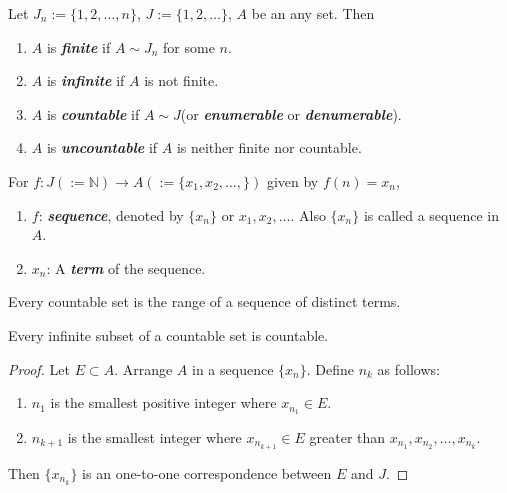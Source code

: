 \begin{definition}[pma 2.4]
Let $J_n:=\{1,2,\dots,n\}$, $J:=\{1,2,\dots\}$, $A$ be an any set. Then
\begin{enumerate}[label={(\arabic*)}]
\item $A$ is \textbf{\emph{finite}} if $A\sim J_n$ for some $n$.
\item $A$ is \textbf{\emph{infinite}} if $A$ is not finite.
\item $A$ is \textbf{\emph{countable}} if $A\sim J$(or \textbf{\emph{enumerable}} or \textbf{\emph{denumerable}}).
\item $A$ is \textbf{\emph{uncountable}} if $A$ is neither finite nor countable.
\end{enumerate}
\end{definition}

\begin{definition}[pma 2.7]
For $f:J(:=\mathbb{N})\to A(:=\{x_1,x_2,\dots,\})$ given by $f(n)=x_n$,
\begin{enumerate}[label={(\arabic*)}]
\item $f$: \textbf{\emph{sequence}}, denoted by $\{x_n\}$ or $x_1,x_2,\dots$. Also $\{x_n\}$ is called a sequence in $A$.
\item $x_n$: A \textbf{\emph{term}} of the sequence.
\end{enumerate}
\end{definition}

\begin{remark}[pma 2.7]
Every countable set is the range of a sequence of distinct terms.
\end{remark}


\begin{theorem}[pma 2.8]
Every infinite subset of a countable set is countable.
\end{theorem}
\begin{proof}
Let $E\subset A$. Arrange $A$ in a sequence $\{x_n\}$. Define $n_k$ as follows:
\begin{enumerate}[label={(\arabic*)}]
\item $n_1$ is the smallest positive integer where $x_{n_1}\in E$.
\item $n_{k+1}$ is the smallest integer where $x_{n_{k+1}}\in E$ greater than $x_{n_1}, x_{n_2}, \dots, x_{n_k}$.
\end{enumerate}
Then $\{x_{n_k}\}$ is an one-to-one correspondence between $E$ and $J$.
\end{proof}

